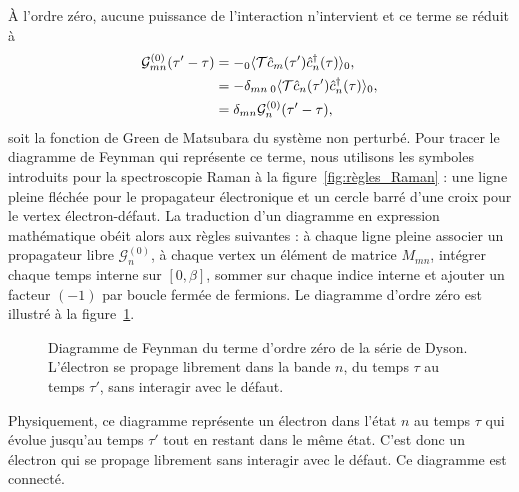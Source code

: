 À l'ordre zéro, aucune puissance de l'interaction n'intervient et ce terme se réduit à
\begin{align}
    \mathcal{G}_{mn}^{(0)}(\tau'-\tau) &= -{}_0\langle\mathcal{T}\hat{c}_m(\tau')\hat{c}^\dag_n(\tau)\rangle_0,\notag\\
    &= -\delta_{mn}\,{}_0\langle\mathcal{T}\hat{c}_n(\tau')\hat{c}^\dag_n(\tau)\rangle_0,\notag\\
    &= \delta_{mn}\mathcal{G}^{(0)}_n(\tau'-\tau),
\end{align}
soit la fonction de Green de Matsubara du système non perturbé. Pour tracer le diagramme de Feynman qui représente ce terme, nous utilisons les symboles introduits pour la spectroscopie Raman à la figure~\ref{fig:règles_Raman} : une ligne pleine fléchée pour le propagateur électronique et un cercle barré d'une croix pour le vertex électron-défaut. La traduction d'un diagramme en expression mathématique obéit alors aux règles suivantes : à chaque ligne pleine associer un propagateur libre $\mathcal{G}^{(0)}_n$, à chaque vertex un élément de matrice $M_{mn}$, intégrer chaque temps interne sur $[0,\beta]$, sommer sur chaque indice interne et ajouter un facteur $(-1)$ par boucle fermée de fermions. Le diagramme d'ordre zéro est illustré à la figure~\ref{fig:dyson_ordre0}.
\begin{figure}[htbp]
    \centering
    
    \caption[Diagramme de Feynman du terme d'ordre zéro de la série de Dyson.]{Diagramme de Feynman du terme d'ordre zéro de la série de Dyson. L'électron se propage librement dans la bande $n$, du temps $\tau$ au temps $\tau'$, sans interagir avec le défaut.}
    \label{fig:dyson_ordre0}
\end{figure}
Physiquement, ce diagramme représente un électron dans l'état $n$ au temps $\tau$ qui évolue jusqu'au temps $\tau'$ tout en restant dans le même état. C'est donc un électron qui se propage librement sans interagir avec le défaut. Ce diagramme est connecté.

